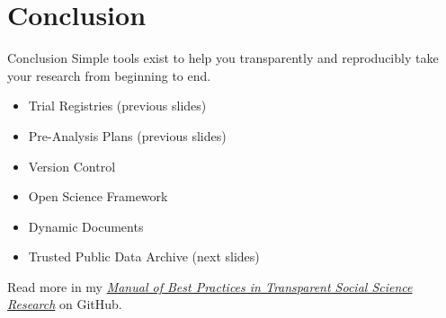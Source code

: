 \documentclass{beamer}
\begin{document}


\section{Conclusion}
\begin{frame}{Conclusion}
Simple tools exist to help you transparently and reproducibly take your research from beginning to end. 
\begin {itemize}
\item Trial Registries (previous slides)
\item Pre-Analysis Plans (previous slides)
\item Version Control
\item Open Science Framework
\item Dynamic Documents
\item Trusted Public Data Archive (next slides)
\end{itemize} 
\vspace{0.25in}
Read more in my \href{http://github.com/garretchristensen/manual}{\textit{Manual of Best Practices in Transparent Social Science Research}} on GitHub.
\end{frame}
\end{document}
